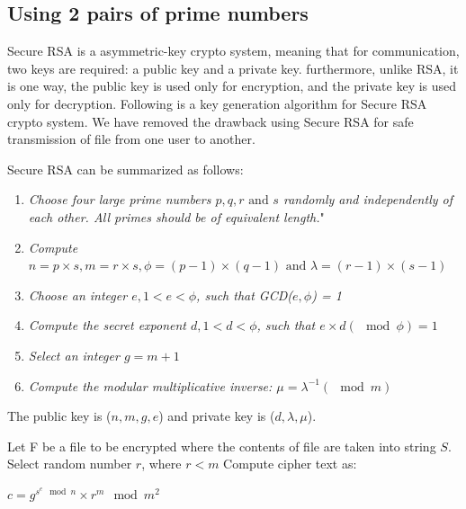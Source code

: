 \documentclass[12pt,journal,compsoc]{IEEEtran}
\begin{document}
\subsection{{Using 2 pairs of prime numbers}}
\label{sec:mrea_algo}

Secure RSA\cite{mrea} is a asymmetric-key crypto system, meaning that for communication, two keys are required: a public key and a private key. furthermore, unlike RSA, it is one way, the public key is used only for encryption, and the private key is used only for decryption. Following is a key generation algorithm for Secure RSA crypto system. We have removed the drawback using Secure RSA for safe transmission of file from one user to another.

Secure RSA can be summarized as follows: \\
\begin{enumerate}[ {STEP }1{:} ]
	\item \emph{Choose four large prime numbers $p, q, r \text{ and } s$ randomly and independently of each other. All primes should be of equivalent length.}"
	\item \emph{Compute $n = p \times s, m=r \times s, \phi = (p-1)\times(q-1) \text{ and } \lambda = (r-1) \times (s-1)$}
	\item \emph{Choose an integer $e, 1 < e < \phi$, such that GCD($e, \phi$) = 1}
		\label{itm:step3}
	\item \emph{Compute the secret exponent $d, 1 < d < \phi$, such that $e \times d (\mod \phi) = 1$}
		\label{itm:step6}
	\item \emph{Select an integer $g = m+1$}
	\item \emph{Compute the modular multiplicative inverse: $\mu = \lambda^{-1} (\mod m)$}
\end{enumerate}
The public key is ($n, m, g, e$) and private key is ($d, \lambda, \mu$). 

Let F be a file to be encrypted where the contents of file are taken into string $S$. Select random number $r$, where $r<m$ Compute cipher text as:
\begin{center}
	$c = g^{s^{e}\mod n} \times r^{m}\mod m^{2}$
\end{center}
\end{document}
